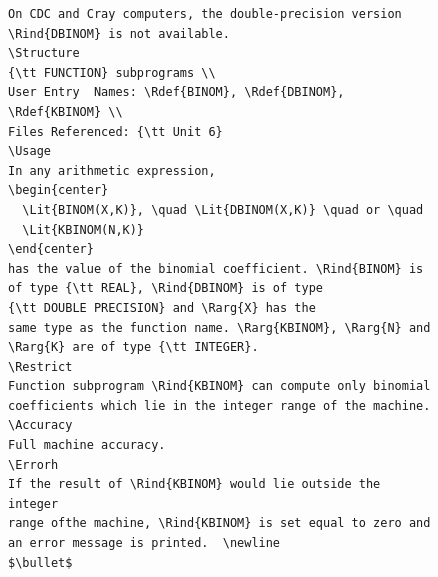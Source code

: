 \documentclass[a4paper,11pt]{cernman}
\begin{document}
\begin{latexonly}
\begin{figure}[p]
\begin{sideways}
\begin{minipage}[b]{\textheight}
\begin{minipage}[b]{.49\textwidth}
\begin{verbatim}
On CDC and Cray computers, the double-precision version
\Rind{DBINOM} is not available.
\Structure
{\tt FUNCTION} subprograms \\
User Entry  Names: \Rdef{BINOM}, \Rdef{DBINOM}, \Rdef{KBINOM} \\
Files Referenced: {\tt Unit 6}
\Usage
In any arithmetic expression,
\begin{center}
  \Lit{BINOM(X,K)}, \quad \Lit{DBINOM(X,K)} \quad or \quad
  \Lit{KBINOM(N,K)}
\end{center}
has the value of the binomial coefficient. \Rind{BINOM} is 
of type {\tt REAL}, \Rind{DBINOM} is of type 
{\tt DOUBLE PRECISION} and \Rarg{X} has the
same type as the function name. \Rarg{KBINOM}, \Rarg{N} and 
\Rarg{K} are of type {\tt INTEGER}.
\Restrict
Function subprogram \Rind{KBINOM} can compute only binomial
coefficients which lie in the integer range of the machine.
\Accuracy
Full machine accuracy.
\Errorh
If the result of \Rind{KBINOM} would lie outside the integer 
range ofthe machine, \Rind{KBINOM} is set equal to zero and 
an error message is printed.  \newline
$\bullet$
\end{verbatim}
\end{minipage}
\hfill
\begin{minipage}[b]{.49\textwidth}

\end{minipage}
\end{minipage}
\end{sideways}
\end{figure}
\end{latexonly}
\end{document}
